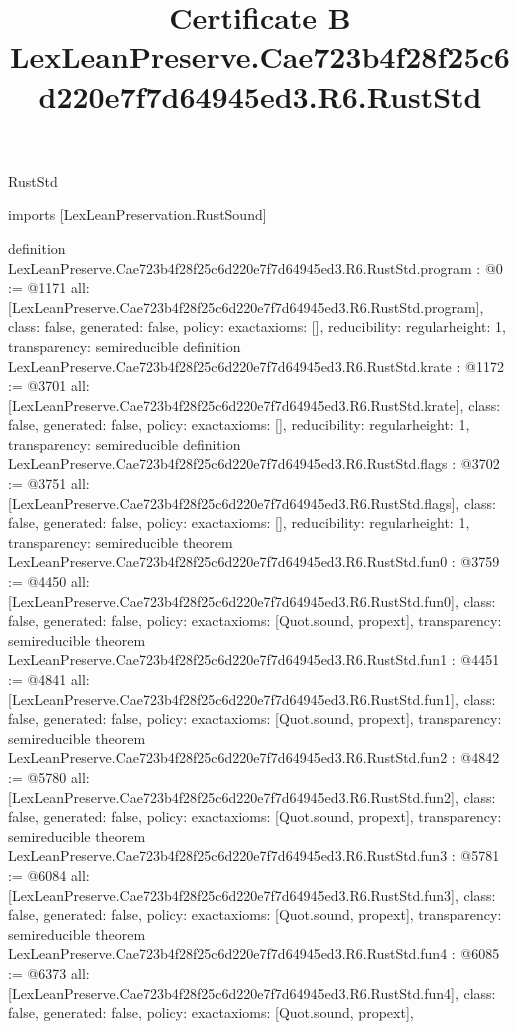 \begin{lexlean}{RustStd}
\title{Certificate B LexLeanPreserve.Cae723b4f28f25c6d220e7f7d64945ed3.R6.RustStd}
\begin{coremodule}
imports [LexLeanPreservation.RustSound]

definition LexLeanPreserve.Cae723b4f28f25c6d220e7f7d64945ed3.R6.RustStd.program : @0 := @1171 {
  all: [LexLeanPreserve.Cae723b4f28f25c6d220e7f7d64945ed3.R6.RustStd.program],
  class: false,
  generated: false,
  policy: exact{axioms: []},
  reducibility: regular{height: 1},
  transparency: semireducible
}
definition LexLeanPreserve.Cae723b4f28f25c6d220e7f7d64945ed3.R6.RustStd.krate : @1172 := @3701 {
  all: [LexLeanPreserve.Cae723b4f28f25c6d220e7f7d64945ed3.R6.RustStd.krate],
  class: false,
  generated: false,
  policy: exact{axioms: []},
  reducibility: regular{height: 1},
  transparency: semireducible
}
definition LexLeanPreserve.Cae723b4f28f25c6d220e7f7d64945ed3.R6.RustStd.flags : @3702 := @3751 {
  all: [LexLeanPreserve.Cae723b4f28f25c6d220e7f7d64945ed3.R6.RustStd.flags],
  class: false,
  generated: false,
  policy: exact{axioms: []},
  reducibility: regular{height: 1},
  transparency: semireducible
}
theorem LexLeanPreserve.Cae723b4f28f25c6d220e7f7d64945ed3.R6.RustStd.fun0 : @3759 := @4450 {
  all: [LexLeanPreserve.Cae723b4f28f25c6d220e7f7d64945ed3.R6.RustStd.fun0],
  class: false,
  generated: false,
  policy: exact{axioms: [Quot.sound, propext]},
  transparency: semireducible
}
theorem LexLeanPreserve.Cae723b4f28f25c6d220e7f7d64945ed3.R6.RustStd.fun1 : @4451 := @4841 {
  all: [LexLeanPreserve.Cae723b4f28f25c6d220e7f7d64945ed3.R6.RustStd.fun1],
  class: false,
  generated: false,
  policy: exact{axioms: [Quot.sound, propext]},
  transparency: semireducible
}
theorem LexLeanPreserve.Cae723b4f28f25c6d220e7f7d64945ed3.R6.RustStd.fun2 : @4842 := @5780 {
  all: [LexLeanPreserve.Cae723b4f28f25c6d220e7f7d64945ed3.R6.RustStd.fun2],
  class: false,
  generated: false,
  policy: exact{axioms: [Quot.sound, propext]},
  transparency: semireducible
}
theorem LexLeanPreserve.Cae723b4f28f25c6d220e7f7d64945ed3.R6.RustStd.fun3 : @5781 := @6084 {
  all: [LexLeanPreserve.Cae723b4f28f25c6d220e7f7d64945ed3.R6.RustStd.fun3],
  class: false,
  generated: false,
  policy: exact{axioms: [Quot.sound, propext]},
  transparency: semireducible
}
theorem LexLeanPreserve.Cae723b4f28f25c6d220e7f7d64945ed3.R6.RustStd.fun4 : @6085 := @6373 {
  all: [LexLeanPreserve.Cae723b4f28f25c6d220e7f7d64945ed3.R6.RustStd.fun4],
  class: false,
  generated: false,
  policy: exact{axioms: [Quot.sound, propext]},
}
\end{coremodule}
\end{lexlean}
